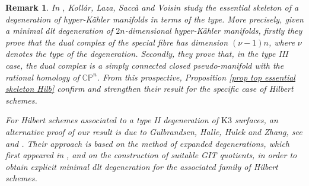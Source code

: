 \documentclass{amsart}%
\numberwithin{equation}{subsection}
\theoremstyle{plain2}
\theoremstyle{definition2}
\newtheorem{rem}[equation]{Remark}
\theoremstyle{stepstyle}
\theoremstyle{point}
\theoremstyle{subpoint}
\newcommand{\CP}{\ensuremath{\mathbb{CP}}}
\begin{document}
{\begin{rem}
In \cite{KollarLazaSaccaEtAl2017}, Koll\'{a}r, Laza, Sacc\`{a} and Voisin study the essential skeleton of a degeneration of hyper-K\"{a}hler manifolds in terms of the type. More precisely, given a minimal dlt degeneration of $2n$-dimensional hyper-K\"{a}hler manifolds, firstly they prove that the dual complex of the special fibre has dimension $(\nu-1)n$, where $\nu$ denotes the type of the degeneration. Secondly, they prove that, in the type III case, the dual complex is a simply connected closed pseudo-manifold with the rational homology of $\CP^n$. From this prospective, Proposition \ref{prop top essential skeleton Hilb} confirm and strengthen their result for the specific case of Hilbert schemes.

For Hilbert schemes associated to a type II degeneration of $\text{K}3$ surfaces, an alternative proof of our result is due to Gulbrandsen, Halle, Hulek and Zhang, see \cite{GulbrandsenHalleHulek2016} and \cite{GulbrandsenHalleHulekEtAl}. Their approach is based on the method of \textit{expanded degenerations}, which first appeared in \cite{Li}, and on the construction of suitable GIT quotients, in order to obtain explicit minimal dlt degeneration for the associated family of Hilbert schemes. 
\end{rem}
}
\end{document}
